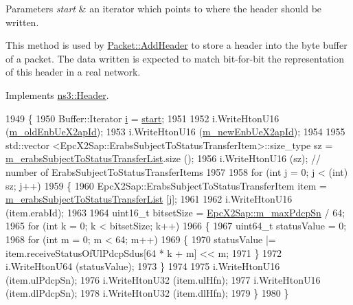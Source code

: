 \begin{DoxyParams}{Parameters}
{\em start} & an iterator which points to where the header should be written.\\
\hline
\end{DoxyParams}
This method is used by \hyperlink{classns3_1_1Packet_a465108c595a0bc592095cbcab1832ed8}{Packet\+::\+Add\+Header} to store a header into the byte buffer of a packet. The data written is expected to match bit-\/for-\/bit the representation of this header in a real network. 

Implements \hyperlink{classns3_1_1Header_afb61f1aac69ff8349a6bfe521fab5404}{ns3\+::\+Header}.


\begin{DoxyCode}
1949 \{
1950   Buffer::Iterator \hyperlink{bernuolliDistribution_8m_a6f6ccfcf58b31cb6412107d9d5281426}{i} = \hyperlink{namespacevisualizer_1_1core_a2a35e5d8a34af358b508dac8635754e0}{start};
1951 
1952   i.WriteHtonU16 (\hyperlink{classns3_1_1EpcX2SnStatusTransferHeader_a90611f272b846cf8617cb050bf2d88db}{m\_oldEnbUeX2apId});
1953   i.WriteHtonU16 (\hyperlink{classns3_1_1EpcX2SnStatusTransferHeader_ad9a1eee78ad41a6f2659d158e75f0d53}{m\_newEnbUeX2apId});
1954 
1955   std::vector <EpcX2Sap::ErabsSubjectToStatusTransferItem>::size\_type sz = 
      \hyperlink{classns3_1_1EpcX2SnStatusTransferHeader_aacd21028528eae5bdea4d2c3fa3974d4}{m\_erabsSubjectToStatusTransferList}.size ();
1956   i.WriteHtonU16 (sz);              \textcolor{comment}{// number of ErabsSubjectToStatusTransferItems}
1957 
1958   \textcolor{keywordflow}{for} (\textcolor{keywordtype}{int} j = 0; j < (int) sz; j++)
1959     \{
1960       EpcX2Sap::ErabsSubjectToStatusTransferItem item = 
      \hyperlink{classns3_1_1EpcX2SnStatusTransferHeader_aacd21028528eae5bdea4d2c3fa3974d4}{m\_erabsSubjectToStatusTransferList} [j];
1961 
1962       i.WriteHtonU16 (item.erabId);
1963 
1964       uint16\_t bitsetSize = \hyperlink{classns3_1_1EpcX2Sap_a41ff74ac24a6c9005d586f75cf366f95}{EpcX2Sap::m\_maxPdcpSn} / 64;
1965       \textcolor{keywordflow}{for} (\textcolor{keywordtype}{int} k = 0; k < bitsetSize; k++)
1966         \{
1967           uint64\_t statusValue = 0;
1968           \textcolor{keywordflow}{for} (\textcolor{keywordtype}{int} m = 0; m < 64; m++)
1969             \{
1970               statusValue |= item.receiveStatusOfUlPdcpSdus[64 * k + m] << m;
1971             \}
1972           i.WriteHtonU64 (statusValue);
1973         \}
1974 
1975       i.WriteHtonU16 (item.ulPdcpSn);
1976       i.WriteHtonU32 (item.ulHfn);
1977       i.WriteHtonU16 (item.dlPdcpSn);
1978       i.WriteHtonU32 (item.dlHfn);
1979     \}
1980 \}
\end{DoxyCode}


